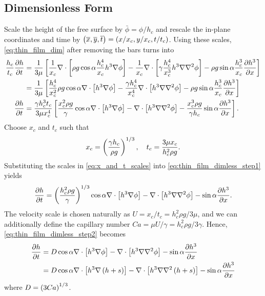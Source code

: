 \subsection{Dimensionless Form}
Scale the height of the free surface by $\bar{\phi} = \phi / h_c$ and rescale the in-plane coordinates and time by 
$\left( \overline{x}, \overline{y}, \overline{t} \right) = \left( x/x_c, y/x_c, t/t_c \right)$. Using these scales, \cref{eq:thin_film_dim} after removing the bars turns into 
\begin{align}
    \nonumber \frac{h_c}{t_c} \frac{\partial h}{\partial t} &= \frac{1}{3\mu} \left[  \frac{1}{x_c} \nabla \cdot \left[  \rho g \cos\alpha \frac{h_c^4}{x_c} h^3 \nabla \phi  \right] - \frac{1}{x_c} \nabla \cdot \left[  \gamma \frac{h_c^4}{x_c^3}h^3 \nabla\nabla^2\phi  \right] - \rho g \sin\alpha \frac{h_c^3}{x_c} \frac{\partial h^3}{\partial x}  \right]\\
    \nonumber &= \frac{1}{3\mu} \left[  \frac{h_c^4}{x_c^2}\rho g \cos\alpha \nabla \cdot \left[  h^3 \nabla \phi  \right] - \frac{\gamma h_c^4}{x_c^4} \nabla \cdot \left[ h^3 \nabla\nabla^2\phi  \right] - \rho g \sin\alpha \frac{h_c^3}{x_c} \frac{\partial h^3}{\partial x}  \right]\\
    \frac{\partial h}{\partial t} &= \frac{\gamma h_c^3 t_c}{3\mu x_c^4}\left[  \frac{x_c^2 \rho g}{\gamma} \cos\alpha \nabla \cdot \left[  h^3 \nabla \phi  \right] - \nabla \cdot \left[ h^3 \nabla\nabla^2\phi  \right] - \frac{x_c^3\rho g}{\gamma h_c} \sin\alpha \frac{\partial h^3}{\partial x}  \right].
    \label{eq:thin_film_dimless_step1}
\end{align}
Choose $x_c$ and $t_c$ such that
\begin{align}
    x_c = \left( \frac{\gamma h_c}{\rho g} \right)^{1/3}, \quad t_c = \frac{3\mu x_c}{h_c^2 \rho g}.
    \label{eq:x_and_t_scales}
\end{align} 
Substituting the scales in \cref{eq:x_and_t_scales} into \cref{eq:thin_film_dimless_step1} yields
\begin{align}
    \frac{\partial h}{\partial t} = \left( \frac{h_c^2 \rho g}{\gamma} \right)^{1/3} \cos\alpha \nabla \cdot \left[  h^3 \nabla \phi  \right] - \nabla \cdot \left[ h^3 \nabla\nabla^2\phi  \right] - \sin\alpha \frac{\partial h^3}{\partial x}. 
    \label{eq:thin_film_dimless_step2}
\end{align} 
The velocity scale is chosen naturally as $U = x_c/t_c = h_c^2\rho g/3\mu$,
and we can additionally define the capillary number $Ca = \mu U / \gamma = h_c^2\rho g/3\gamma$. 
Hence, \cref{eq:thin_film_dimless_step2} becomes 
\begin{align}
    \nonumber \frac{\partial h}{\partial t} &= D\cos\alpha \nabla \cdot \left[ h^3\nabla\phi \right] - \nabla \cdot \left[ h^3\nabla\nabla^2\phi \right] - \sin\alpha \frac{\partial h^3}{\partial x}\\
    &= D\cos\alpha \nabla \cdot \left[ h^3\nabla\left( h+s \right) \right] - \nabla \cdot \left[ h^3\nabla\nabla^2\left( h+s \right) \right] - \sin\alpha \frac{\partial h^3}{\partial x}
    \label{eq:thin_film_dimless}
\end{align}
where $D = \left( 3Ca \right)^{1/3}$. 
